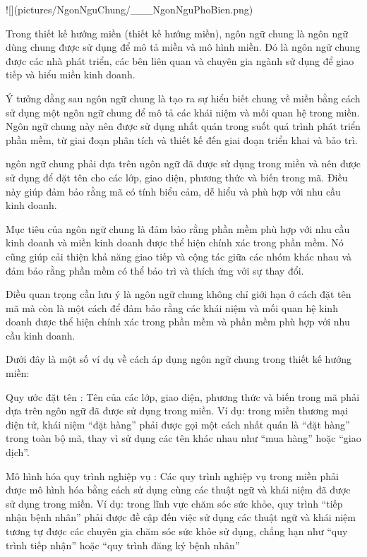 ![](pictures/NgonNguChung/___NgonNguPhoBien.png)



Trong thiết kế hướng miền (thiết kế hướng miền), ngôn ngữ chung là ngôn ngữ dùng chung được sử dụng để mô tả miền và mô hình miền. Đó là ngôn ngữ chung được các nhà phát triển, các bên liên quan và chuyên gia ngành sử dụng để giao tiếp và hiểu miền kinh doanh.

Ý tưởng đằng sau ngôn ngữ chung là tạo ra sự hiểu biết chung về miền bằng cách sử dụng một ngôn ngữ chung để mô tả các khái niệm và mối quan hệ trong miền. Ngôn ngữ chung này nên được sử dụng nhất quán trong suốt quá trình phát triển phần mềm, từ giai đoạn phân tích và thiết kế đến giai đoạn triển khai và bảo trì.

ngôn ngữ chung phải dựa trên ngôn ngữ đã được sử dụng trong miền và nên được sử dụng để đặt tên cho các lớp, giao diện, phương thức và biến trong mã. Điều này giúp đảm bảo rằng mã có tính biểu cảm, dễ hiểu và phù hợp với nhu cầu kinh doanh.

Mục tiêu của ngôn ngữ chung là đảm bảo rằng phần mềm phù hợp với nhu cầu kinh doanh và miền kinh doanh được thể hiện chính xác trong phần mềm. Nó cũng giúp cải thiện khả năng giao tiếp và cộng tác giữa các nhóm khác nhau và đảm bảo rằng phần mềm có thể bảo trì và thích ứng với sự thay đổi.

Điều quan trọng cần lưu ý là ngôn ngữ chung không chỉ giới hạn ở cách đặt tên mã mà còn là một cách để đảm bảo rằng các khái niệm và mối quan hệ kinh doanh được thể hiện chính xác trong phần mềm và phần mềm phù hợp với nhu cầu kinh doanh.

Dưới đây là một số ví dụ về cách áp dụng ngôn ngữ chung trong thiết kế hướng miền:

Quy ước đặt tên : Tên của các lớp, giao diện, phương thức và biến trong mã phải dựa trên ngôn ngữ đã được sử dụng trong miền. Ví dụ: trong miền thương mại điện tử, khái niệm “đặt hàng” phải được gọi một cách nhất quán là “đặt hàng” trong toàn bộ mã, thay vì sử dụng các tên khác nhau như “mua hàng” hoặc “giao dịch”.

Mô hình hóa quy trình nghiệp vụ : Các quy trình nghiệp vụ trong miền phải được mô hình hóa bằng cách sử dụng cùng các thuật ngữ và khái niệm đã được sử dụng trong miền. Ví dụ: trong lĩnh vực chăm sóc sức khỏe, quy trình “tiếp nhận bệnh nhân” phải được đề cập đến việc sử dụng các thuật ngữ và khái niệm tương tự được các chuyên gia chăm sóc sức khỏe sử dụng, chẳng hạn như “quy trình tiếp nhận” hoặc “quy trình đăng ký bệnh nhân”

